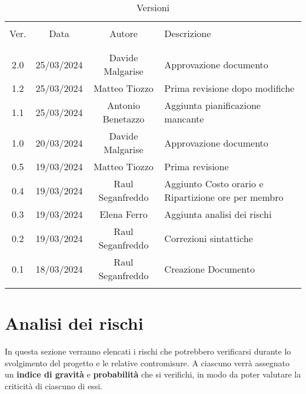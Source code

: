 \documentclass[italian,12pt]{article} %
\begin{document}


\newpage




\begin{table}[!h]
	\caption{Versioni}
	\begin{center}
		\begin{tabular}{ c c c p{9cm} }
			\hline                                                                                      \\[-2ex]
			Ver. & Data       & Autore           & Descrizione                                          \\
			\\[-2ex] \hline \\[-1.5ex]
			2.0 & 25/03/2024 & Davide Malgarise & Approvazione documento\\
			1.2 & 25/03/2024 & Matteo Tiozzo & Prima revisione dopo modifiche\\
			1.1  & 25/03/2024 & Antonio Benetazzo & Aggiunta pianificazione mancante                    \\
			1.0  & 20/03/2024 & Davide Malgarise  & Approvazione documento                              \\
			0.5  & 19/03/2024 & Matteo Tiozzo     & Prima revisione                                     \\
			0.4  & 19/03/2024 & Raul Seganfreddo  & Aggiunto Costo orario e Ripartizione ore per membro \\
			0.3  & 19/03/2024 & Elena Ferro       & Aggiunta analisi dei rischi                         \\
			0.2  & 19/03/2024 & Raul Seganfreddo  & Correzioni sintattiche                              \\
			0.1  & 18/03/2024 & Raul Seganfreddo  & Creazione Documento                                 \\
			\\[-1.5ex] \hline
		\end{tabular}
	\end{center}
\end{table}

\newpage

\tableofcontents

\newpage

\section{Analisi dei rischi}
In questa sezione verranno elencati i rischi che potrebbero verificarsi durante lo svolgimento del progetto e le relative contromisure.
A ciascuno verrà assegnato un \textbf{indice di gravità} e \textbf{probabilità} che si verifichi, in modo da poter valutare la criticità di ciascuno di essi.
\end{document}
